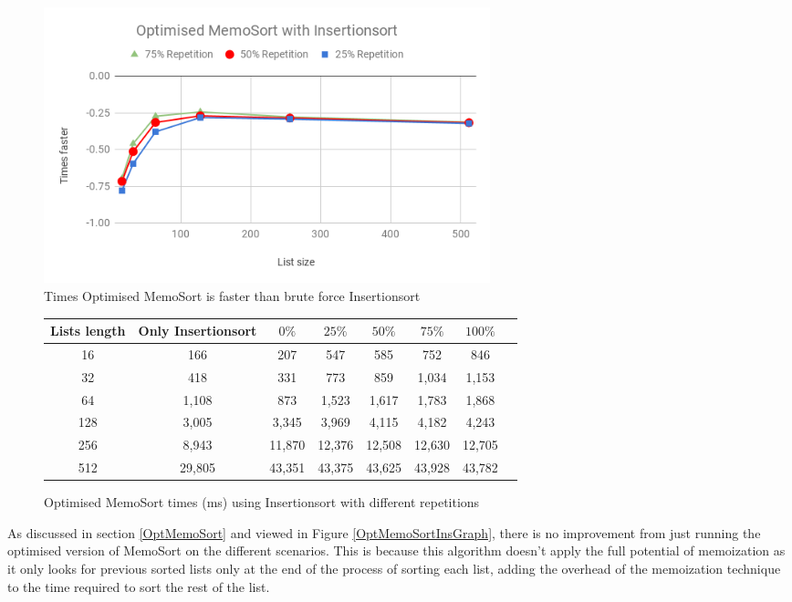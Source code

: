 \documentclass[a4paper,12pt]{article}
\begin{document}
\begin{figure}[H]
    \centering
    \includegraphics[height=8cm,keepaspectratio]{./images/OptMemoSortIns.png}
    \caption{Times Optimised MemoSort is faster than brute force Insertionsort}
    \label{fig:OptMemoSortInsGraph}
\end{figure}

\begin{figure}[H]
\centering
\begin{tabular}{|c|c|c|c|c|c|c|c|}  \toprule
	{Lists length} & {Only Insertionsort} & {$0\%$} & {$25\%$} & {$50\%$} & {$75\%$} & {$100\%$} \\ \midrule
	16 &166&207&547 & 585 & 752 & 846\\ 
	32 &418&331&773 & 859& 1,034& 1,153\\ 
	64 &1,108&873 &1,523&1,617&1,783& 1,868\\ 
	128 &3,005&3,345&3,969&4,115&4,182 &4,243\\ 
	256 &8,943&11,870&12,376 &12,508&12,630&12,705\\ 
	512 &29,805 & 43,351&43,375 &43,625 &43,928 &43,782\\ \bottomrule
\end{tabular}
\caption{Optimised MemoSort times (ms) using Insertionsort with different repetitions}
\label{ref:OptMemoSortInsTable}
\end{figure}


As discussed in section \ref{OptMemoSort} and viewed in Figure \ref{OptMemoSortInsGraph}, there is no improvement from just running the optimised version of MemoSort on the different scenarios. This is because this algorithm doesn't apply the full potential of memoization as it only looks for previous sorted lists only at the end of the process of sorting each list, adding the overhead of the memoization technique to the time required to sort the rest of the list. \\
\end{document}
